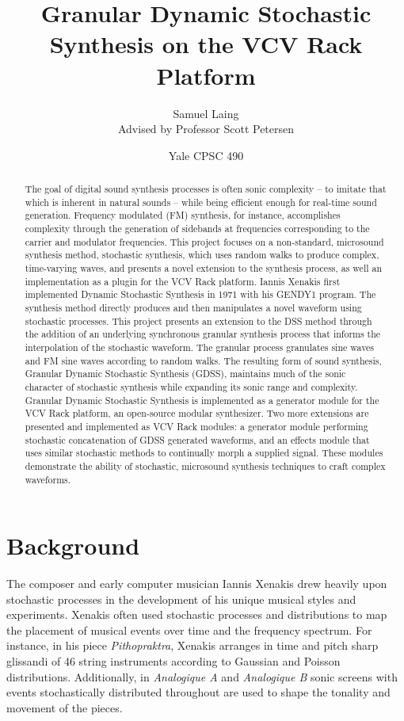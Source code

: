\documentclass[10pt]{article}
\title{Granular Dynamic Stochastic Synthesis on the VCV Rack Platform}
\author{
Samuel Laing \\
Advised by Professor Scott Petersen
}
\date{Yale CPSC 490}
\begin{document}
\maketitle
\begin{abstract}
The goal of digital sound synthesis processes is often sonic complexity -- to imitate that which is inherent in natural sounds -- while being efficient enough for real-time sound generation. Frequency modulated (FM) synthesis, for instance, accomplishes complexity through the generation of sidebands at frequencies corresponding to the carrier and modulator frequencies. This project focuses on a non-standard, microsound synthesis method, stochastic synthesis, which uses random walks to produce complex, time-varying waves, and presents a novel extension to the synthesis process, as well an implementation as a plugin for the VCV Rack platform. Iannis Xenakis first implemented Dynamic Stochastic Synthesis in 1971 with his GENDY1 program. The synthesis method directly produces and then manipulates a novel waveform using stochastic processes. This project presents an extension to the DSS method through the addition of an underlying synchronous granular synthesis process that informs the interpolation of the stochastic waveform. The granular process granulates sine waves and FM sine waves according to random walks. The resulting form of sound synthesis, Granular Dynamic Stochastic Synthesis (GDSS), maintains much of the sonic character of stochastic synthesis while expanding its sonic range and complexity. Granular Dynamic Stochastic Synthesis is implemented as a generator module for the VCV Rack platform, an open-source modular synthesizer. Two more extensions are presented and implemented as VCV Rack modules: a generator module performing stochastic concatenation of GDSS generated waveforms, and an effects module that uses similar stochastic methods to continually morph a supplied signal. These modules demonstrate the ability of stochastic, microsound synthesis techniques to craft complex waveforms.
\end{abstract}

\pagebreak
\section{Background}
The composer and early computer musician Iannis Xenakis drew heavily upon stochastic processes in the development of his unique musical styles and experiments. Xenakis often used stochastic processes and distributions to map the placement of musical events over time and the frequency spectrum. For instance, in his piece \textit{Pithopraktra}, Xenakis arranges in time and pitch sharp glissandi of 46 string instruments according to Gaussian and Poisson distributions.\citep{xenakis1992} Additionally, in \textit{Analogique A} and \textit{Analogique B} sonic screens with events stochastically distributed throughout are used to shape the tonality and movement of the pieces. 
\end{document}
